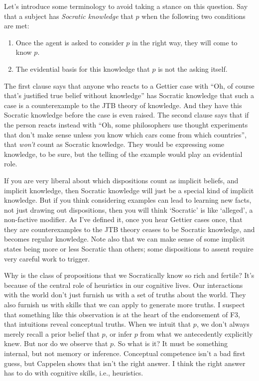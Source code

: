 Let's introduce some terminology to avoid taking a stance on this question. Say that a subject has \textit{Socratic knowledge} that $p$ when the following two conditions are met:

\begin{enumerate}
\item Once the agent is asked to consider $p$ in the right way, they will come to know $p$.
\item The evidential basis for this knowledge that $p$ is not the asking itself.
\end{enumerate}

\noindent The first clause says that anyone who reacts to a Gettier case with ``Oh, of course that's justified true belief without knowledge'' has Socratic knowledge that such a case is a counterexample to the JTB theory of knowledge. And they have this Socratic knowledge before the case is even raised. The second clause says that if the person reacts instead with ``Oh, some philosophers use thought experiments that don't make sense unless you know which cars come from which countries'', that \textit{won't} count as Socratic knowledge. They would be expressing some knowledge, to be sure, but the telling of the example would play an evidential role.

If you are very liberal about which dispositions count as implicit beliefs, and implicit knowledge, then Socratic knowledge will just be a special kind of implicit knowledge. But if you think considering examples can lead to learning new facts, not just drawing out dispositions, then you will think `Socratic' is like `alleged', a non-factive modifier. As I've defined it, once you hear Gettier cases once, that they are counterexamples to the JTB theory ceases to be Socratic knowledge, and becomes regular knowledge. Note also that we can make sense of some implicit states being more or less Socratic than others; some dispositions to assent require very careful work to trigger.

Why is the class of propositions that we Socratically know so rich and fertile? It's because of the central role of heuristics in our cognitive lives. Our interactions with the world don't just furnish us with a set of truths about the world. They also furnish us with skills that we can apply to generate more truths. I suspect that something like this observation is at the heart of the endorsement of F3, that intuitions reveal conceptual truths. When we intuit that $p$, we don't always merely recall a prior belief that $p$, or infer $p$ from what we antecedently explicitly knew. But nor do we observe that $p$. So what is it? It must be something internal, but not memory or inference. Conceptual competence isn't a bad first guess, but Cappelen shows that isn't the right answer. I think the right answer has to do with cognitive skills, i.e., heuristics.


